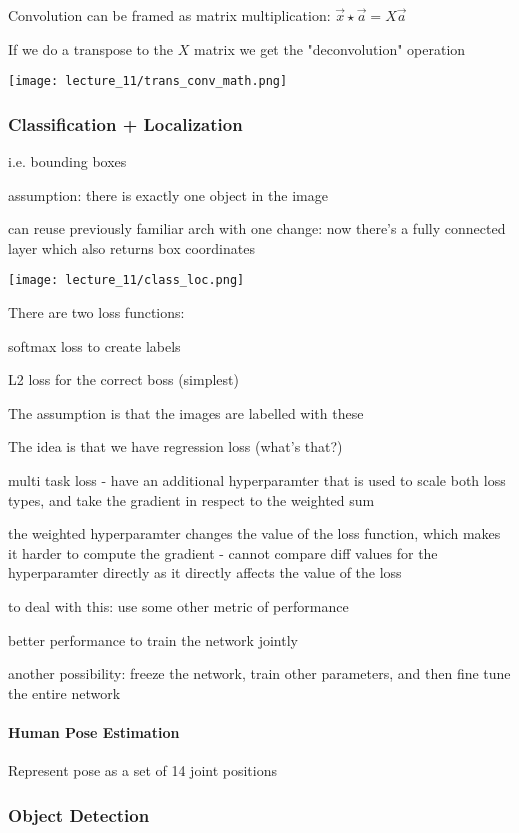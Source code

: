 Convolution can be framed as matrix multiplication: $\vec x \star \vec a = X\vec a$

If we do a transpose to the $X$ matrix we get the "deconvolution" operation

\texttt{[image: lecture\_11/trans\_conv\_math.png]}

\subsubsection{Classification + Localization}

i.e. bounding boxes

assumption: there is exactly one object in the image

can reuse previously familiar arch with one change: now there's a fully connected layer which also returns box coordinates

\texttt{[image: lecture\_11/class\_loc.png]}

There are two loss functions:

softmax loss to create labels

L2 loss for the correct boss (simplest)

The assumption is that the images are labelled with these

The idea is that we have regression loss (what's that?)

multi task loss - have an additional hyperparamter that is used to scale both loss types, and take the gradient in respect to the weighted sum

the weighted hyperparamter changes the value of the loss function, which makes it harder to compute the gradient - cannot compare diff values for the hyperparamter directly as it directly affects the value of the loss

to deal with this: use some other metric of performance

better performance to train the network jointly

another possibility: freeze the network, train other parameters, and then fine tune the entire network

\paragraph{Human Pose Estimation}

Represent pose as a set of 14 joint positions

\subsubsection{Object Detection}

